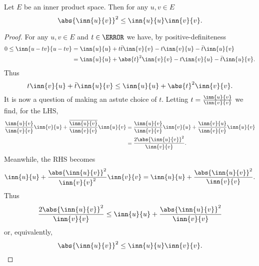 \documentclass[12pt,oneside]{book}
\begin{document}
\begin{theorem} \label{theo:cauchy-schwarz}
	Let \( E \) be an inner product space. Then for any \( u, v \in E \)
	\begin{equation*}
		\abs{\inn{u}{v}}^2 \leq \inn{u}{u} \inn{v}{v}.
	\end{equation*}
\end{theorem}
\begin{proof}
	For any \( u, v \in E \) and \( t \in \C \) we have, by positive-definiteness
	\begin{align*}
		0 \leq \inn{u - tv}{u - tv} & = \inn{u}{u} + t\bar{t}\inn{v}{v} - t \inn{v}{u} - \bar{t}
		\inn{u}{v} \\
																& = \inn{u}{u} + \abs{t}^2\inn{v}{v} - t \inn{v}{u} - \bar{t}
		\inn{u}{v}.
	\end{align*}
	Thus
	\begin{equation*}
		t \inn{v}{u} + \bar{t} \inn{u}{v} \leq \inn{u}{u} + \abs{t}^2 \inn{v}{v}.
	\end{equation*}
	It is now a question of making an astute choice of \( t \). Letting \( t =
	\frac{\inn{u}{v}}{\inn{v}{v}} \) we find, for the LHS,
	\begin{align*}
		\frac{\inn{u}{v}}{\inn{v}{v}} \inn{v}{u} + \frac{\overline{\inn{u}{v}}}{\inn{v}{v}}
		\inn{u}{v} & = \frac{\inn{u}{v}}{\inn{v}{v}} \inn{v}{u}	+
		\frac{\inn{v}{u}}{\inn{v}{v}} \inn{u}{v} \\
							 & = \frac{2\abs{\inn{u}{v}}^2}{\inn{v}{v}}.
	\end{align*}
	Meanwhile, the RHS becomes
	\begin{equation*}
		\inn{u}{u} + \frac{\abs{\inn{u}{v}}^2}{\inn{v}{v}^2} \inn{v}{v} = \inn{u}{u} +
		\frac{\abs{\inn{u}{v}}^2}{\inn{v}{v}}.
	\end{equation*}
	Thus
	\begin{equation*}
		\frac{2\abs{\inn{u}{v}}^2}{\inn{v}{v}} \leq \inn{u}{u} +
		\frac{\abs{\inn{u}{v}}^2}{\inn{v}{v}}
	\end{equation*}
	or, equivalently,
	\begin{equation*}
		\abs{\inn{u}{v}}^2 \leq \inn{u}{u} \inn{v}{v}.
	\end{equation*}
\end{proof}
\end{document}
